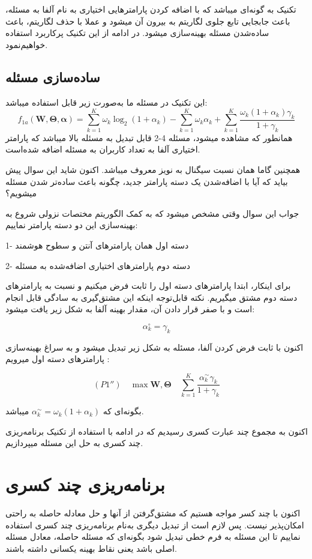 تکنیک به گونه‌ای میباشد که با اضافه کردن پارامترهایی اختیاری به نام آلفا به مسئله، باعث جابجایی تابع جلوی لگاریتم به بیرون آن میشود و عملا با حذف لگاریتم، باعث ساده‌شدن مسئله بهینه‌سازی میشود. در ادامه از این تکنیک پرکاربرد استفاده خواهیم‌نمود.
\subsection{ساده‌سازی مسئله}
این تکنیک در مسئله ما به‌صورت زیر قابل استفاده میباشد:
\[
f_{1a}(\mathbf{W}, \boldsymbol{\Theta}, \boldsymbol{\alpha}) = \sum_{k=1}^{K} \omega_k \log_2(1 + \alpha_k) - \sum_{k=1}^{K} \omega_k \alpha_k + \sum_{k=1}^{K} \frac{\omega_k (1 + \alpha_k) \gamma_k}{1 + \gamma_k}
\]
همانطور که مشاهده میشود، مسئله 4-2 قابل تبدیل به مسئله بالا میباشد که پارامتر اختیاری آلفا به تعداد کاربران به مسئله اضافه شده‌است.

همچنین گاما همان نسبت سیگنال به نویز معروف میباشد.
اکنون شاید این سوال پیش بیاید که آیا با اضافه‌شدن یک دسته پارامتر جدید، چگونه باعث ساده‌تر شدن مسئله میشویم؟

جواب این سوال وقتی مشخص میشود که به کمک الگوریتم مختصات نزولی شروع به بهینه‌سازی این دو دسته پارامتر نماییم:

1- دسته اول همان پارامترهای آنتن و سطوح هوشمند

2- دسته دوم پارامترهای اختیاری اضافه‌شده به مسئله

برای اینکار، ابتدا پارامترهای دسته اول را ثابت فرض میکنیم و نسبت به پارامترهای دسته دوم مشتق میگیریم.
نکته قابل‌توجه اینکه این مشتق‌گیری به سادگی قابل انجام است و با صفر قرار دادن آن، مقدار بهینه آلفا به شکل زیر یافت میشود:

 \[\alpha_k^\circ = \gamma_k\]

 اکنون با ثابت فرض کردن آلفا، مسئله به شکل زیر تبدیل میشود و به سراغ بهینه‌سازی پارامترهای دسته اول میرویم :
 
 \[
 (P1'') \quad \max \mathbf{W}, \boldsymbol{\Theta} \quad \sum_{k=1}^{K} \frac{\alpha_k^\sim \gamma_k}{1 + \gamma_k}
 \]
 
 بگونه‌ای که $\alpha_k^\sim = \omega_k(1 + \alpha_k)$ میباشد.
 
 اکنون به مجموع چند عبارت کسری رسیدیم که در ادامه با استفاده از تکنیک برنامه‌ریزی چند کسری به حل این مسئله میپردازیم.
\section{برنامه‌ریزی چند کسری}
اکنون با چند کسر مواجه هستیم که مشتق‌گرفتن از آنها و حل معادله حاصله به راحتی امکان‌پذیر نیست. پس لازم است از تبدیل دیگری به‌نام برنامه‌ریزی چند کسری استفاده نماییم تا این مسئله به فرم خطی تبدیل شود بگونه‌ای که مسئله حاصله، معادل مسئله اصلی باشد یعنی نقاط بهینه یکسانی داشته باشند. 

